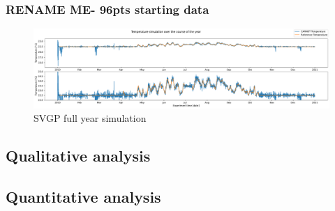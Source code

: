 \clearpage

\subsubsection{RENAME ME- 96pts starting data}

\begin{figure}[ht]
    \centering
    \includegraphics[width =
    \textwidth]{Plots/6_SVGP_96pts_inf_window_12_averageYear_fullyear.pdf}
    \caption{SVGP full year simulation}
    \label{fig:SVGP_96pts_fullyear_simulation}
\end{figure}

\clearpage

\subsection{Qualitative analysis}

\subsection{Quantitative analysis}


\clearpage
